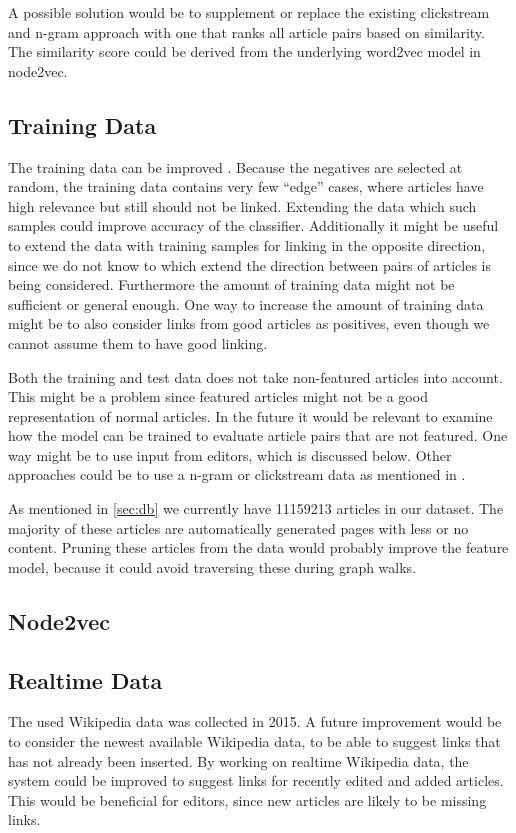 A possible solution would be to supplement or replace the existing clickstream and n-gram approach with one that ranks all article pairs based on similarity. The similarity score could be derived from the underlying word2vec model in node2vec.

\subsection{Training Data}
The training data can be improved . Because the negatives are selected at random, the training data contains very few \enquote{edge} cases, where articles have high relevance but still should not be linked. Extending the data which such samples could improve accuracy of the classifier. Additionally it might be useful to extend the data with training samples for linking in the opposite direction, since we do not know to which extend the direction between pairs of articles is being considered.
Furthermore the amount of training data might not be sufficient or general enough. One way to increase the amount of training data might be to also consider links from good articles as positives, even though we cannot assume them to have good linking.

Both the training and test data does not take non-featured articles into account. This might be a problem since featured articles might not be a good representation of normal articles. In the future it would be relevant to examine how the model can be trained to evaluate article pairs that are not featured. One way might be to use input from editors, which is discussed below. Other approaches could be to use a n-gram or clickstream data as mentioned in .

As mentioned in \cref{sec:db} we currently have \num{11159213} articles in our dataset. The majority of these articles are automatically generated pages with less or no content. Pruning these articles from the data would probably improve the feature model, because it could avoid traversing these during graph walks.

\subsection{Node2vec}


\subsection{Realtime Data}
The used Wikipedia data was collected in 2015. A future improvement would be to consider the newest available Wikipedia data, to be able to suggest links that has not already been inserted.
By working on realtime Wikipedia data, the system could be improved to suggest links for recently edited and added articles. This would be beneficial for editors, since new articles are likely to be missing links.

